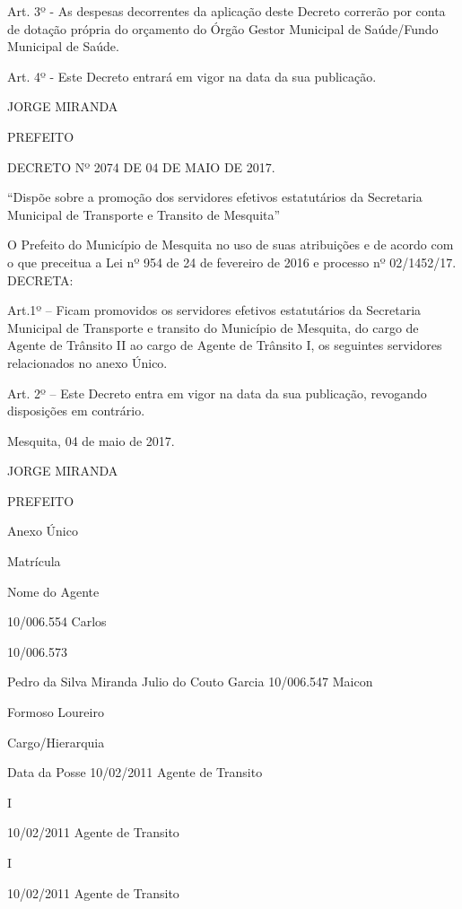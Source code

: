\documentclass{doliberto}
\begin{document}
 Art. 3º - As despesas decorrentes da aplicação deste Decreto 
correrão  por  conta  de  dotação  própria  do  orçamento  do 
Órgão  Gestor  Municipal  de  Saúde/Fundo  Municipal  de 
Saúde.  
 
Art.  4º  -  Este  Decreto  entrará  em  vigor  na  data  da  sua 
publicação.  
 

JORGE MIRANDA 

PREFEITO 

 
 

 

DECRETO Nº 2074 DE 04 DE MAIO DE 2017. 

 

 

                                         “Dispõe 
sobre  a  promoção  dos 
servidores efetivos estatutários da Secretaria Municipal de 
Transporte e Transito de Mesquita” 
 

    O  Prefeito  do  Município  de  Mesquita  no  uso  de  suas 
atribuições e de acordo com o que preceitua a Lei nº 954 de 
24 de fevereiro de 2016 e processo nº 02/1452/17. 
    DECRETA: 
 
Art.1º  –  Ficam  promovidos  os  servidores  efetivos 
estatutários  da  Secretaria  Municipal  de  Transporte  e 
transito do Município de Mesquita, do cargo de Agente de 
Trânsito II ao cargo de Agente de Trânsito I, os seguintes 
servidores relacionados no anexo Único. 
 
Art.  2º  –  Este  Decreto  entra  em  vigor  na  data  da  sua 
publicação, revogando disposições em contrário. 
 
  Mesquita, 04 de maio de 2017. 

JORGE MIRANDA 

PREFEITO  

Anexo Único 

Matrícula 

Nome do 
Agente 

10/006.554  Carlos 

10/006.573 

Pedro da 
Silva 
Miranda 
Julio do 
Couto 
Garcia 
10/006.547  Maicon 

Formoso 
Loureiro 

Cargo/Hierarquia 

Data da 
Posse 
10/02/2011  Agente de Transito 

I 

10/02/2011  Agente de Transito 

I 

10/02/2011  Agente de Transito 
\end{document}
